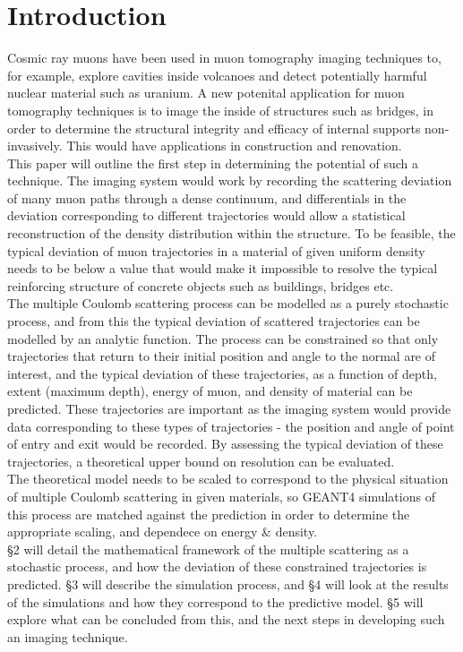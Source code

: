 \documentclass{article}
\numberwithin{equation}{section}
\begin{document}
\section{Introduction}
Cosmic ray muons have been used in muon tomography imaging techniques to, for example, explore cavities inside volcanoes and detect potentially harmful nuclear material such as uranium. A new potenital application for muon tomography techniques is to image the inside of structures such as bridges, in order to determine the structural integrity and efficacy of internal supports non-invasively. This would have applications in construction and renovation.\\
\vspace{0.1in}
This paper will outline the first step in determining the potential of such a technique. The imaging system would work by recording the scattering deviation of many muon paths through a dense continuum, and differentials in the deviation corresponding to different trajectories would allow a statistical reconstruction of the density distribution within the structure. To be feasible, the typical deviation of muon trajectories in a material of given uniform density needs to be below a value that would make it impossible to resolve the typical reinforcing structure of concrete objects such as buildings, bridges etc.\\
\vspace{0.1in}
The multiple Coulomb scattering process can be modelled as a purely stochastic process, and from this the typical deviation of scattered trajectories can be modelled by an analytic function. The process can be constrained so that only trajectories that return to their initial position and angle to the normal are of interest, and the typical deviation of these trajectories, as a function of depth, extent (maximum depth), energy of muon, and density of material can be predicted. These trajectories are important as the imaging system would provide data corresponding to these types of trajectories - the position and angle of point of entry and exit would be recorded. By assessing the typical deviation of these trajectories, a theoretical upper bound on resolution can be evaluated.\\
\vspace{0.1in}
The theoretical model needs to be scaled to correspond to the physical situation of multiple Coulomb scattering in given materials, so GEANT4 simulations of this process are matched against the prediction in order to determine the appropriate scaling, and dependece on energy \& density.\\
\vspace{0.1in}
§2 will detail the mathematical framework of the multiple scattering as a stochastic process, and how the deviation of these constrained trajectories is predicted. §3 will describe the simulation process, and §4 will look at the results of the simulations and how they correspond to the predictive model. §5 will explore what can be concluded from this, and the next steps in developing such an imaging technique.\\
\clearpage
\end{document}
